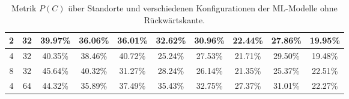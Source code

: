\begin{table}[h!]
\begin{tabular}{ | c | c | c | c | c | c | c | c | c | c | }
        2 & 32 & 39.97\% & 36.06\% & 36.01\% & 32.62\% & 30.96\% & 22.44\% & 27.86\% & 19.95\% \\\hline
        4 & 32 & 40.35\% & 38.46\% & 40.72\% & 25.24\% & 27.53\% & 21.71\% & 29.50\% & 19.48\% \\\hline
        8 & 32 & 45.64\% & 40.32\% & 31.27\% & 28.24\% & 26.14\% & 21.35\% & 25.37\% & 22.51\% \\\hline
        4 & 64 & 44.32\% & 35.89\% & 37.49\% & 35.43\% & 32.75\% & 27.37\% & 31.01\% & 22.27\% \\\hline
    \end{tabular}
    \caption{Metrik $P(C)$ über Standorte und verschiedenen Konfigurationen der ML-Modelle ohne Rückwärtskante.}
    \label{tab:predictions_by_acc_pic_wo_fb}
\end{table}
